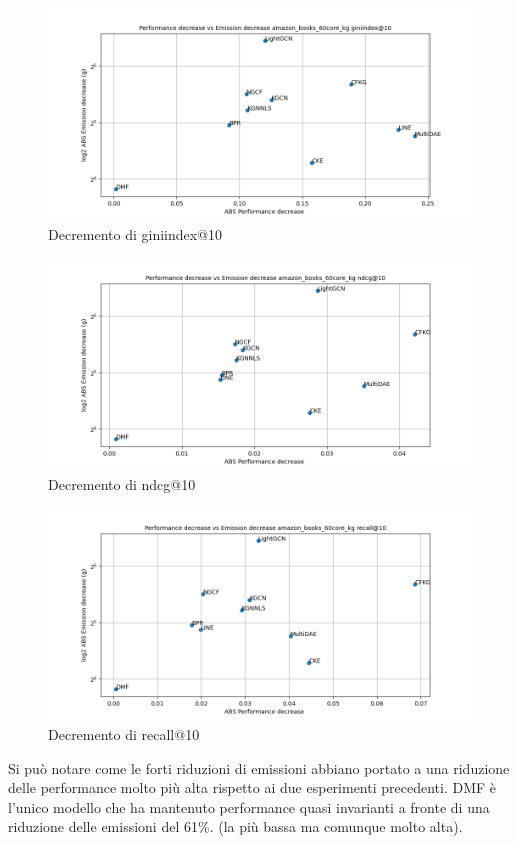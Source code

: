 \begin{figure}[H]
    \centering
     \includegraphics[width=\textwidth]{images/decrement_giniindex@10_amazon_books_60core_kg.png}
    \caption{Decremento di giniindex@10}
\end{figure}

\begin{figure}[H]
    \centering
     \includegraphics[width=\textwidth]{images/decrement_ndcg@10_amazon_books_60core_kg.png}
    \caption{Decremento di ndcg@10}
\end{figure}

\begin{figure}[H]
    \centering
     \includegraphics[width=\textwidth]{images/decrement_recall@10_amazon_books_60core_kg.png}
    \caption{Decremento di recall@10}
\end{figure}
\noindent Si può notare come le forti riduzioni di emissioni abbiano portato a una riduzione delle performance molto più alta rispetto ai due esperimenti precedenti.
DMF è l'unico modello che ha mantenuto performance quasi invarianti a fronte di una riduzione delle emissioni del 61\%. (la più bassa ma comunque molto alta).
    

